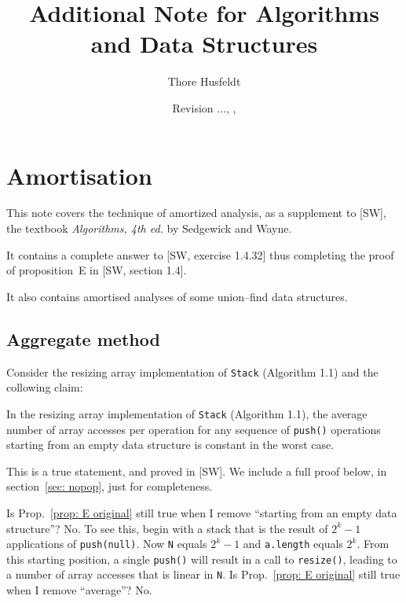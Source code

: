 \documentclass{tstextbook}
\title{Additional Note for Algorithms and Data Structures}
\author{Thore Husfeldt}
\date{\small Revision {\tt \GITAbrHash}$\ldots$, \GITAuthorDate, \GITAuthorName}
\begin{document}
\maketitle

\chapter{Amortisation}
\label{sec-1.1}
  \begin{summary}
    This note covers the technique of amortized analysis, as a
  supplement to [SW], the textbook \emph{Algorithms, 4th ed.} by
  Sedgewick and Wayne.

  It contains a complete answer to [SW, exercise 1.4.32] thus completing the
  proof of proposition~E in [SW, section 1.4].
  
  It also contains amortised analyses of some union--find data structures.
  \end{summary}

  \section{Aggregate method}
Consider the resizing array implementation of {\tt Stack} (Algorithm 1.1) and the collowing claim:

\begin{theorem}
  \label{prop: E original}
  In the resizing array
  implementation of {\tt Stack} (Algorithm 1.1), the average number of
  array accesses per operation for any sequence of {\tt push()} operations starting
  from an empty data structure is constant in the worst case.
\end{theorem}

This is a true statement, and proved in [SW].
We include a full proof below, in section~\ref{sec: nopop}, just for completeness.

\begin{ExerciseList}
  \Exercise
  Is Prop.~\ref{prop: E original} still true when I remove ``starting from an empty data
structure''?
\Answer
No.
To see this, begin with a stack that is the result of $2^k-1$
applications of {\tt push(null)}. 
Now {\tt N} equals $2^k-1$ and {\tt  a.length} equals $2^k$. 
From this starting position, a single {\tt push()} will result in
a call to {\tt resize()}, leading to a  number of array accesses that is
linear in {\tt N}.
  \Exercise
  Is Prop.~\ref{prop: E original} still true when I remove ``average''?
\Answer
No.
\end{ExerciseList}
\end{document}
